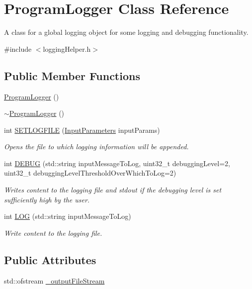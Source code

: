 \hypertarget{classProgramLogger}{\section{Program\-Logger Class Reference}
\label{classProgramLogger}
}


A class for a global logging object for some logging and debugging functionality.  




{\ttfamily \#include $<$logging\-Helper.\-h$>$}

\subsection*{Public Member Functions}
\begin{DoxyCompactItemize}
\item 
\hyperlink{classProgramLogger_a9eccf2fe0e1fae09753ce44bc01cdc95}{Program\-Logger} ()
\item 
\hyperlink{classProgramLogger_a8bf760dfa45d3e58aa3315098e2dd507}{$\sim$\-Program\-Logger} ()
\item 
int \hyperlink{classProgramLogger_a64f5fd0ed7c17adf98545729f13234fc}{S\-E\-T\-L\-O\-G\-F\-I\-L\-E} (\hyperlink{classInputParameters}{Input\-Parameters} input\-Params)
\begin{DoxyCompactList}\small\item\em Opens the file to which logging information will be appended. \end{DoxyCompactList}\item 
int \hyperlink{classProgramLogger_afac112802f3baae79b6d87d387dfdfad}{D\-E\-B\-U\-G} (std\-::string input\-Message\-To\-Log, uint32\-\_\-t debugging\-Level=2, uint32\-\_\-t debugging\-Level\-Threshold\-Over\-Which\-To\-Log=2)
\begin{DoxyCompactList}\small\item\em Writes content to the logging file and stdout if the debugging level is set sufficiently high by the user. \end{DoxyCompactList}\item 
int \hyperlink{classProgramLogger_a9ae26969295c85f553a3a8152cf1bda6}{L\-O\-G} (std\-::string input\-Message\-To\-Log)
\begin{DoxyCompactList}\small\item\em Write content to the logging file. \end{DoxyCompactList}\end{DoxyCompactItemize}
\subsection*{Public Attributes}
\begin{DoxyCompactItemize}
\item 
std\-::ofstream \hyperlink{classProgramLogger_a8f50db08351b68577720255843dfd629}{\-\_\-output\-File\-Stream}
\end{DoxyCompactItemize}


